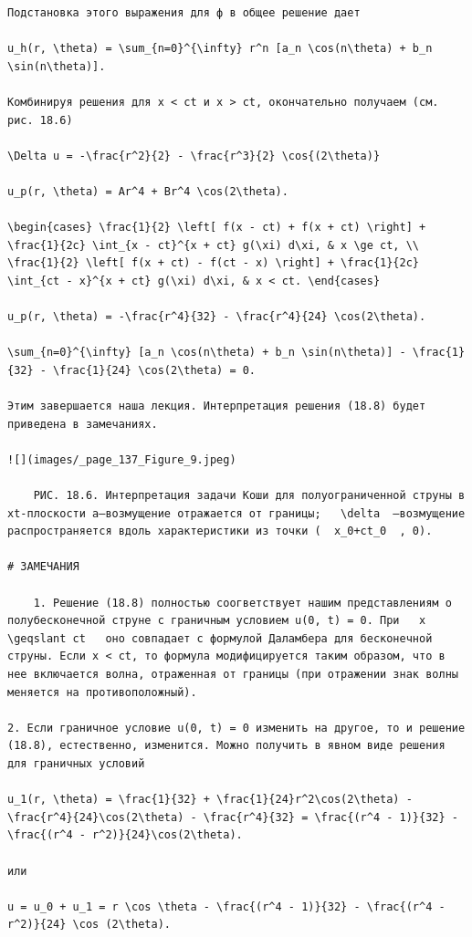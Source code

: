 \documentclass[
  ukrainian,
]{article}
\begin{document}
\begin{verbatim}
Подстановка этого выражения для ф в общее решение дает

u_h(r, \theta) = \sum_{n=0}^{\infty} r^n [a_n \cos(n\theta) + b_n \sin(n\theta)].

Комбинируя решения для x < ct и x > ct, окончательно получаем (см. рис. 18.6)

\Delta u = -\frac{r^2}{2} - \frac{r^3}{2} \cos{(2\theta)}

u_p(r, \theta) = Ar^4 + Br^4 \cos(2\theta).

\begin{cases} \frac{1}{2} \left[ f(x - ct) + f(x + ct) \right] + \frac{1}{2c} \int_{x - ct}^{x + ct} g(\xi) d\xi, & x \ge ct, \\ \frac{1}{2} \left[ f(x + ct) - f(ct - x) \right] + \frac{1}{2c} \int_{ct - x}^{x + ct} g(\xi) d\xi, & x < ct. \end{cases}

u_p(r, \theta) = -\frac{r^4}{32} - \frac{r^4}{24} \cos(2\theta).

\sum_{n=0}^{\infty} [a_n \cos(n\theta) + b_n \sin(n\theta)] - \frac{1}{32} - \frac{1}{24} \cos(2\theta) = 0.

Этим завершается наша лекция. Интерпретация решения (18.8) будет приведена в замечаниях.

![](images/_page_137_Figure_9.jpeg)

    РИС. 18.6. Интерпретация задачи Коши для полуограниченной струны в xt-плоскости a—возмущение отражается от границы;   \delta  —возмущение распространяется вдоль характеристики из точки (  x_0+ct_0  , 0).

# ЗАМЕЧАНИЯ

    1. Решение (18.8) полностью соогветствует нашим представлениям о полубесконечной струне с граничным условием u(0, t) = 0. При   x \geqslant ct   оно совпадает с формулой Даламбера для бесконечной струны. Если x < ct, то формула модифицируется таким образом, что в нее включается волна, отраженная от границы (при отражении знак волны меняется на противоположный).

2. Если граничное условие u(0, t) = 0 изменить на другое, то и решение (18.8), естественно, изменится. Можно получить в явном виде решения для граничных условий

u_1(r, \theta) = \frac{1}{32} + \frac{1}{24}r^2\cos(2\theta) - \frac{r^4}{24}\cos(2\theta) - \frac{r^4}{32} = \frac{(r^4 - 1)}{32} - \frac{(r^4 - r^2)}{24}\cos(2\theta).

или

u = u_0 + u_1 = r \cos \theta - \frac{(r^4 - 1)}{32} - \frac{(r^4 - r^2)}{24} \cos (2\theta).


\end{verbatim}
\end{document}
